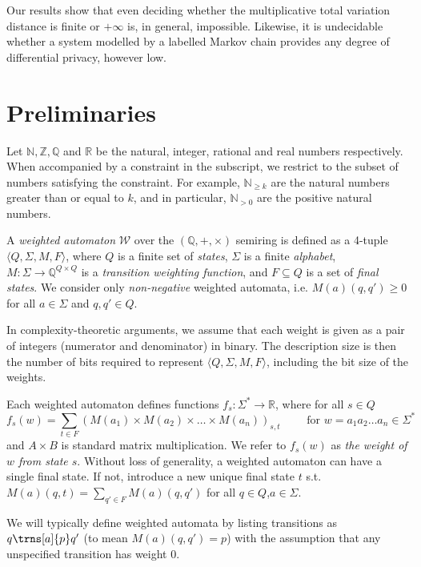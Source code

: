\documentclass[10pt,a4paper]{amsart}
\numberwithin{equation}{section}
\theoremstyle{plain}
\theoremstyle{definition}
\theoremstyle{remark}
\newcommand\abra[1]{\langle #1 \rangle}
\newcommand\pbra[1]{\left( #1 \right)}
\newcommand\wa{\mathcal{W}}
\renewcommand\nu{f}
\begin{document}
Our results show that even deciding whether the multiplicative total variation distance
is finite or $+\infty$ is, in general, impossible.
Likewise, it is undecidable whether a system modelled by a labelled Markov chain provides any degree of differential privacy, however low.

\section{Preliminaries}\label{sec:prelims}

Let $\mathbb{N},\mathbb{Z},\mathbb{Q}$ and $\mathbb{R}$ be the natural, integer, rational and real numbers respectively. When accompanied by a constraint in the subscript, we restrict to the subset of numbers satisfying the constraint. For example, $\mathbb{N}_{\ge k}$ are the natural numbers greater than or equal to $k$, and in particular, $\mathbb{N}_{>0}$ are the positive natural numbers.

\begin{defi}
A \emph{weighted automaton} $\wa$ over the $(\mathbb{Q},{+},{\times})$ semiring is defined as
a 4-tuple $\abra{Q, \Sigma{}, M, F}$, where
$Q$ is a finite set of \emph{states},
$\Sigma$ is a finite \emph{alphabet},
$M: \Sigma{} \to \mathbb{Q}^{Q\times Q}$ is a \emph{transition weighting function},
and $F \subseteq Q$ is a set of \emph{final states}.
We consider only \textit{non-negative} weighted automata, i.e. $M(a)(q,q') \ge 0$ for all $a\in \Sigma$ and $q,q' \in Q$.
\end{defi}
In complexity-theoretic arguments, we assume that each weight is given as a pair of integers (numerator and denominator) in binary.
The description size is then the number of bits required to represent $\abra{Q,\Sigma,M, F}$, including the bit size of the weights.

Each weighted automaton defines functions $\nu_s: \Sigma^* \to \mathbb{R}$, where for all $s\in Q$
\[\nu_s(w) = \sum_{t\in F} \pbra{M(a_1)\times M(a_2)\times \dots \times M(a_n)}_{s,t}
\qquad\text{ for  $w= a_1a_2\dots a_n\in\Sigma^\ast$ }
\]
and
$A\times B$ is standard matrix multiplication. We refer to $\nu_s(w)$ as \emph{the weight of $w$ from state $s$}.
Without loss of generality, a weighted automaton can have a single final state. If not,  introduce a new unique final state
$t$ s.t.\ $M(a)(q,t) = \sum_{q'\in F} M(a)(q,q')$ for all $q\in Q$,$a\in \Sigma$.

We will typically define weighted automata by listing transitions as $q\trns[a]{p}q'$ (to mean $M(a)(q,q') = p$) with the assumption that any unspecified transition has weight $0$.
\end{document}
